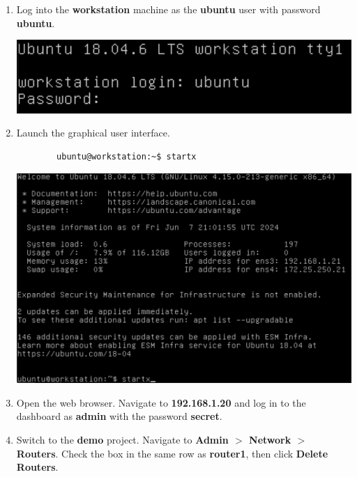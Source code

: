 \documentclass[letterpaper, 12pt]{article}
\begin{document}
\begin{enumerate}
    \item Log into the \textbf{workstation} machine as the \textbf{ubuntu} user with password \textbf{ubuntu}.

    \begin{center}
        \includegraphics[width=\linewidth]{images/part1/step1.png}
    \end{center}

    \item Launch the graphical user interface.
    \begin{lstlisting}
        ubuntu@workstation:~$ startx
    \end{lstlisting}

    \begin{center}
        \includegraphics[width=\linewidth]{images/part1/step2.png}
    \end{center}

    \item Open the web browser. Navigate to \textbf{192.168.1.20} and log in to the dashboard as \textbf{admin}
    with the password \textbf{secret}.

    \item Switch to the \textbf{demo} project. Navigate to \textbf{Admin $>$ Network $>$ Routers}. Check the box in the
    same row as \textbf{router1}, then click \textbf{Delete Routers}.


\end{enumerate}
\end{document}
